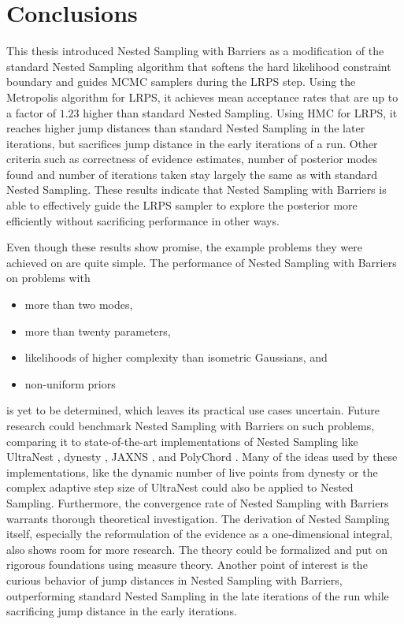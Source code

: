 \documentclass[12pt, a4paper]{report}
\begin{document}
\chapter{Conclusions}
This thesis introduced Nested Sampling with Barriers as a modification of the standard Nested Sampling algorithm that softens the hard likelihood constraint boundary and guides MCMC samplers during the LRPS step.
Using the Metropolis algorithm for LRPS, it achieves mean acceptance rates that are up to a factor of $1.23$ higher than standard Nested Sampling.
Using HMC for LRPS, it reaches higher jump distances than standard Nested Sampling in the later iterations, but sacrifices jump distance in the early iterations of a run.
Other criteria such as correctness of evidence estimates, number of posterior modes found and number of iterations taken stay largely the same as with standard Nested Sampling.
These results indicate that Nested Sampling with Barriers is able to effectively guide the LRPS sampler to explore the posterior more efficiently without sacrificing performance in other ways.

Even though these results show promise, the example problems they were achieved on are quite simple.
The performance of Nested Sampling with Barriers on problems with
\begin{itemize}
    \item more than two modes,
    \item more than twenty parameters,
    \item likelihoods of higher complexity than isometric Gaussians, and
    \item non-uniform priors
\end{itemize}
is yet to be determined, which leaves its practical use cases uncertain.
Future research could benchmark Nested Sampling with Barriers on such problems, comparing it to state-of-the-art implementations of Nested Sampling like UltraNest \cite{ultranest}, dynesty \cite{dynesty}, JAXNS \cite{jaxns}, and PolyChord \cite{polychord}.
Many of the ideas used by these implementations, like the dynamic number of live points from dynesty or the complex adaptive step size of UltraNest could also be applied to Nested Sampling.
Furthermore, the convergence rate of Nested Sampling with Barriers warrants thorough theoretical investigation.
The derivation of Nested Sampling itself, especially the reformulation of the evidence as a one-dimensional integral, also shows room for more research.
The theory could be formalized and put on rigorous foundations using measure theory.
Another point of interest is the curious behavior of jump distances in Nested Sampling with Barriers, outperforming standard Nested Sampling in the late iterations of the run while sacrificing jump distance in the early iterations.
\end{document}
